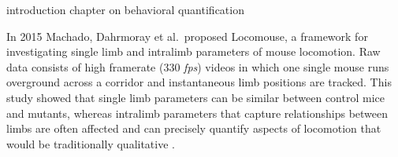 


introduction chapter on behavioral quantification

In 2015 Machado, Dahrmoray et al.~proposed Locomouse, a framework for investigating single limb and intralimb parameters of mouse locomotion. Raw data consists of high framerate (330 \textit{fps}) videos in which one single mouse runs overground across a corridor and instantaneous limb positions are tracked. This study showed that single limb parameters can be similar between control mice and mutants, whereas intralimb parameters that capture relationships between limbs are often affected and can precisely quantify aspects of locomotion that would be traditionally qualitative \cite{machado_quantitative_2015}. 






